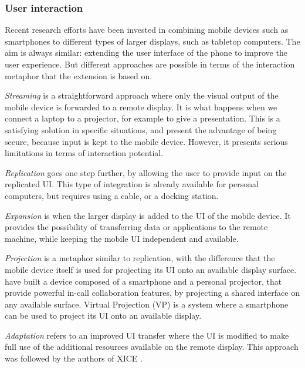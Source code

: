 \subsubsection{User interaction}


Recent research efforts have been invested in combining mobile devices such as smartphones to different types of larger displays, such as tabletop computers.
The aim is always similar: extending the user interface of the phone to improve the user experience.
But different approaches are possible in terms of the interaction metaphor that the extension is based on.

\emph{Streaming} is a straightforward approach where only the visual output of the mobile device is forwarded to a remote display.
It is what happens when we connect a laptop to a projector, for example to give a presentation.
This is a satisfying solution in specific situations, and present the advantage of being secure, because input is kept to the mobile device.
However, it presents serious limitations in terms of interaction potential.

\emph{Replication} goes one step further, by allowing the user to provide input on the replicated UI.
This type of integration is already available for personal computers, but requires using a cable, or a docking station.

\emph{Expansion} is when the larger display is added to the UI of the mobile device.
It provides the possibility of transferring data or applications to the remote  machine, while keeping the mobile UI independent and available.

\emph{Projection} is a metaphor similar to replication, with the difference that the mobile device itself is used for projecting its UI onto an available display surface.
\cite{Winkler:2011:interactivephonecall} have built a device composed of a smartphone and a personal projector, that provide powerful in-call collaboration features, by projecting a shared interface on any available surface.
Virtual Projection (VP) \citep{Baur:2012:virtualprojection} is a system where a smartphone can be used to project its UI onto an available display.

\emph{Adaptation} refers to an improved UI transfer where the UI is modified to make full use of the additional resources available on the remote display.
This approach was followed by the authors of XICE \citep{Arthur:2011:xice}.


